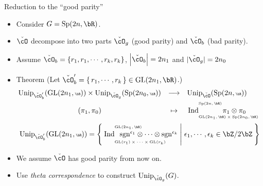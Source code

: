 \documentclass[t,mathserif,11pt,handout,usenames,dvipsnames]{beamer}
\theoremstyle{plain}
\theoremstyle{definition}
\def\sgn{{\rm sgn}}
\def\abs#1{\left|{#1}\right|}
\def\GL{\mathrm{GL}}
\def\Ind{{\rm Ind}}
\def\Sp{{\mathrm{Sp}}}
\def\Unip{{\mathrm{Unip}}}
\def\ckcO{{\check{\cO}}}
\def\blue{\color{blue}}
\def\red{\color{red}}
\def\lblue{\color{blue}}
\let\oldemph\emph
\def\emph#1{\oldemph{\blue #1}}
\begin{document}
\begin{frame}{Reduction to the ``good parity''}
    \begin{itemize}
    \item Consider $G= \Sp(2n,\bR)$. 
    \item  $\ckcO$ decompose into two parts $\ckcO_{g}$ (good parity)  and $\ckcO_{b}$ (bad parity).
    \item Assume $\ckcO_{b} = \{r_1, r_1, \cdots, r_k, r_k\}$,  $\abs{\ckcO_b}=2n_1$ and 
    $|\ckcO_{g}| = 2n_0$
    \item[] {\lblue Theorem} (Let $\ckcO'_b = \set{r_1,\cdots, r_k}\in \GL(2n_1,\bR)$.)
    \[
    \hspace{-2em}
    \begin{array}{ccc}
    {\tiny\Unip_{\ckcO'_b}(\GL(2n_1,\bR))
    \times \Unip_{\ckcO_g}(\Sp(2n_0,\bR))} &\longrightarrow &
    {\tiny \Unip_{\ckcO}(\Sp(2n,\bR))} \\[.6em]
    (\pi_1,\pi_0 ) &\mapsto & \Ind_{\raisebox{-0.5em}{\tiny$\GL(2n_1,\bR)\times \Sp(2n_0,\bR)$}}^{\tiny\raisebox{1em}{$\Sp(2n,\bR)$}}
    \hspace{-5em}\pi_1\otimes \pi_0
    \end{array}
    \]
    \[
    \begin{split}
    {\tiny\Unip_{\ckcO'_b}(\GL(2n_1,\bR))}
    = 
    \Set{\Ind_{\raisebox{-0.7em}{\tiny$\GL(r_1)\times\cdots\times \GL(r_k)$}}^{\tiny\raisebox{1em}{$\GL(2n_1,\bR)$}} \hspace{-6.8em}\raisebox{0em}{ $\sgn^{\epsilon_1}\otimes \cdots \otimes\sgn^{\epsilon_k}$}
    | 
    \epsilon_1,\cdots, \epsilon_k \in \bZ/2\bZ}
    \end{split}
    \]
    \item We assume  $\ckcO$ has {\red good parity} from now on.
    \item Use \emph{theta correspondence}  to construct 
    $ \Unip_{\ckcO_{g}}(G)$.
    \end{itemize}
\end{frame}
\end{document}
